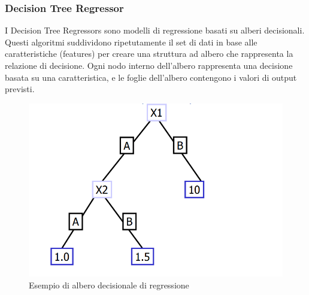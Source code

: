 \subsubsection{Decision Tree Regressor}

I Decision Tree Regressors sono modelli di regressione basati su alberi decisionali. Questi algoritmi suddividono ripetutamente il set di dati in base alle caratteristiche (features) per creare una struttura ad albero che rappresenta la relazione di decisione. Ogni nodo interno dell'albero rappresenta una decisione basata su una caratteristica, e le foglie dell'albero contengono i valori di output previsti.
\begin{figure}[H]
    \centering
    \includegraphics[scale=0.5]{images/DecisionTreeRegressor.png}
    \caption{Esempio di albero decisionale di regressione}
\end{figure}

